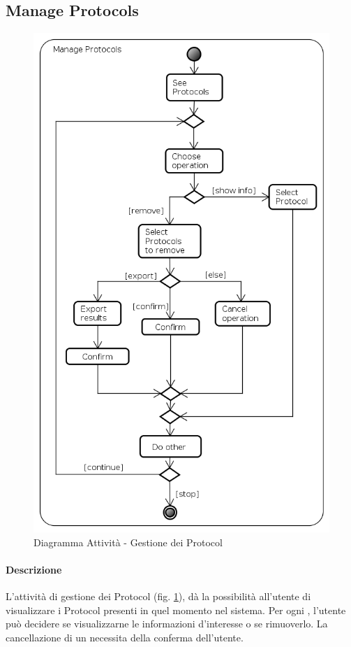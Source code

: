 \subsection{Manage Protocols}
\label{ManageProt}
\begin{figure}[!h]
\centering
\includegraphics[width=0.8\linewidth]{./Content/Immagini/Manage_Protocols}
\caption{Diagramma Attività - Gestione dei Protocol}
\label{ManagePr}
\end{figure}
\paragraph{Descrizione\\}
L'attività di gestione dei Protocol\glossario{} (fig. \ref{ManagePr}), dà la possibilità all'utente di visualizzare i Protocol\glossario{} presenti in quel momento nel sistema. Per ogni \protocol{}, l'utente può decidere se visualizzarne le informazioni d'interesse o se rimuoverlo. La cancellazione di un \protocol{} necessita della conferma dell'utente.
\pagebreak

